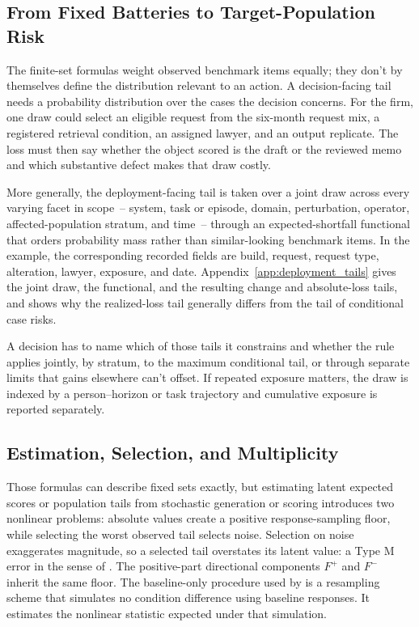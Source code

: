 \documentclass[12pt]{article}
\begin{document}
\subsection{From Fixed Batteries to Target-Population Risk}\label{ssec:target_risk}

The finite-set formulas weight observed benchmark items equally; they don't by themselves define the distribution relevant to an action. A decision-facing tail needs a probability distribution over the cases the decision concerns. For the firm, one draw could select an eligible request from the six-month request mix, a registered retrieval condition, an assigned lawyer, and an output replicate. The loss must then say whether the object scored is the draft or the reviewed memo and which substantive defect makes that draw costly.

More generally, the deployment-facing tail is taken over a joint draw across every varying facet in scope~-- system, task or episode, domain, perturbation, operator, affected-population stratum, and time~-- through an expected-shortfall functional that orders probability mass rather than similar-looking benchmark items. In the example, the corresponding recorded fields are build, request, request type, alteration, lawyer, exposure, and date. Appendix~\ref{app:deployment_tails} gives the joint draw, the functional, and the resulting change and absolute-loss tails, and shows why the realized-loss tail generally differs from the tail of conditional case risks.

A decision has to name which of those tails it constrains and whether the rule applies jointly, by stratum, to the maximum conditional tail, or through separate limits that gains elsewhere can't offset. If repeated exposure matters, the draw is indexed by a person--horizon or task trajectory and cumulative exposure is reported separately.

\subsection{Estimation, Selection, and Multiplicity}\label{ssec:uncertainty}

Those formulas can describe fixed sets exactly, but estimating latent expected scores or population tails from stochastic generation or scoring introduces two nonlinear problems: absolute values create a positive response-sampling floor, while selecting the worst observed tail selects noise. Selection on noise exaggerates magnitude, so a selected tail overstates its latent value: a Type M error in the sense of \textcite{gelman2014types}. The positive-part directional components \(F^+\) and \(F^-\) inherit the same floor. The baseline-only  procedure used by \textcite{zhang2026illusionRobustness} is a resampling scheme that simulates no condition difference using baseline responses. It estimates the nonlinear statistic expected under that simulation.
\end{document}
